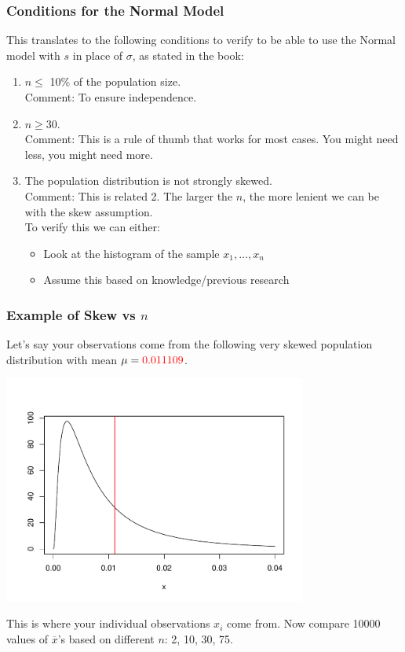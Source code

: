 \documentclass[handout]{beamer}
\newcommand{\blue}[1]{\textcolor{blue2}{#1}}
\newcommand{\xbar}{\overline{x}}
\begin{document}
\begin{frame}
\frametitle{Conditions for the Normal Model}

%
%
This translates to the following conditions to verify to be able to use the Normal model with $s$ in place of $\sigma$, as stated in the book:

\begin{enumerate}
\pause\item $n\leq$ 10\% of the population size.\\
\pause Comment:  To ensure independence.
\pause\item $n \geq 30$.\\
\pause Comment:  This is a \blue{rule of thumb} that works for most cases.  You might need less, you might need more.
\pause \item The population distribution is not strongly skewed.\\
Comment: This is related \blue{2}.  The larger the $n$, the more lenient we can be with the skew assumption.\\
To verify this we can either:
\begin{itemize}
\item Look at the histogram of the sample $x_1, \ldots, x_n$
\item Assume this based on knowledge/previous research
\end{itemize}
\end{enumerate}

\end{frame}


\begin{frame}
\frametitle{Example of Skew vs $n$}
Let's say your observations come from the following very skewed \blue{population distribution} with mean $\mu=\textcolor{red}{0.011109}$. 
\begin{center}
\pause\includegraphics[width=0.75\textwidth]{figure/true.pdf}
\end{center}
\pause  This is where your individual observations $x_i$ come from.  \pause Now compare 10000 values of $\xbar$'s based on different $n$:  2, 10, 30, 75.   
\end{frame}
\end{document}
